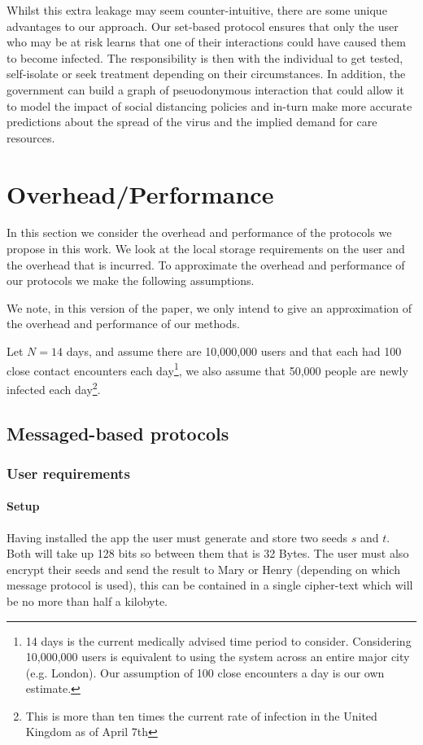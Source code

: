 \documentclass{article}
\begin{document}
Whilst this extra leakage may seem counter-intuitive, there are some unique advantages to our approach. Our set-based protocol ensures that only the user who may be at risk learns that one of their interactions could have caused them to become infected. The responsibility is then with the individual to get tested, self-isolate or seek treatment depending on their circumstances. In addition, the government can build a graph of pseuodonymous interaction that could allow it to model the impact of social distancing policies and in-turn make more accurate predictions about the spread of the virus and the implied demand for care resources. 

\section{Overhead/Performance} \label{sec:overhead}

In this section we consider the overhead and performance of the protocols we propose in this work. We look at the local storage requirements on the user and the overhead that is incurred. To approximate the overhead and performance of our protocols we make the following assumptions.

We note, in this version of the paper, we only intend to give an approximation of the overhead and performance of our methods.

Let $N=14$ days, and assume there are 10,000,000 users and that each had 100 close contact encounters each day\footnote{14 days is the current medically advised time period to consider. Considering 10,000,000 users is equivalent to using the system across an entire major city (e.g. London). Our assumption of 100 close encounters a day is our own estimate.}, we also assume that 50,000 people are newly infected each day\footnote{This is more than ten times the current rate of infection in the United Kingdom as of April 7th}. 

\subsection{Messaged-based protocols}

\subsubsection{User requirements}

\paragraph{Setup}
Having installed the app the user must generate and store two seeds $s$ and $t$. Both will take up 128 bits so between them that is 32 Bytes. The user must also encrypt their seeds and send the result to Mary or Henry (depending on which message protocol is used), this can be contained in a single cipher-text which will be no more than half a kilobyte.
\end{document}
